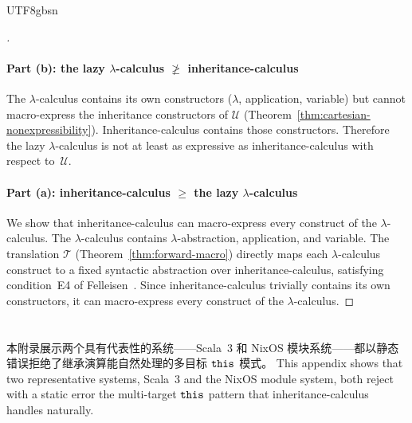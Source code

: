\begin{CJK*}{UTF8}{gbsn}
\begin{proof}[]
  \paragraph{Part (b): the lazy $\lambda$-calculus $\not\geq$
  inheritance-calculus}
  The $\lambda$-calculus contains its own constructors
  ($\lambda$, application, variable) but
  cannot macro-express the inheritance constructors of
  $\mathscr{U}$
  (Theorem~\ref{thm:cartesian-nonexpressibility}).
  Inheritance-calculus contains those constructors.
  Therefore the lazy $\lambda$-calculus is not at least
  as expressive as inheritance-calculus with respect
  to~$\mathscr{U}$.

  \paragraph{Part (a): inheritance-calculus $\geq$ the lazy
  $\lambda$-calculus}
  We show that inheritance-calculus can macro-express
  every construct of the $\lambda$-calculus.
  The $\lambda$-calculus contains $\lambda$-abstraction,
  application, and variable.
  The translation $\mathcal{T}$ (Theorem~\ref{thm:forward-macro})
  directly maps each $\lambda$-calculus construct to a
  fixed syntactic abstraction over inheritance-calculus,
  satisfying condition~E4 of
  Felleisen~\cite[Definition~3.11]{felleisen1991-expressive-power}.
  Since inheritance-calculus trivially contains its own
  constructors, it can macro-express every construct of
  the $\lambda$-calculus.
  \fi
\end{proof}

\section{}
\label{app:scala-multi-target}

\ifPaperChinese
本附录展示两个具有代表性的系统——Scala~3 和 NixOS 模块系统——都以静态错误拒绝了继承演算能自然处理的多目标 $\mathtt{this}$ 模式。
\else
This appendix shows that two representative systems, Scala~3 and the NixOS
module system, both reject with a static error the multi-target $\mathtt{this}$ pattern
that inheritance-calculus handles naturally.
\fi

\subsection*{}


\end{CJK*}

